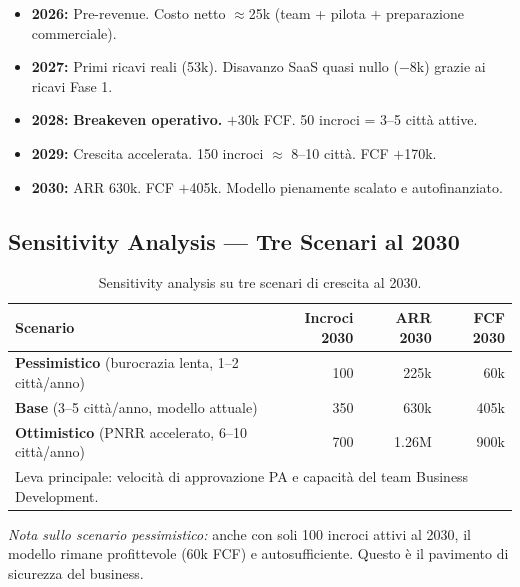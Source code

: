 \documentclass[a4paper,11pt]{article}
\begin{document}
\begin{tcolorbox}[
    enhanced, colback=green!5!white, colframe=SmartGreen,
    title=\textbf{Milestone Finanziarie Chiave}, boxrule=0.5mm
]
\begin{itemize}[nosep, topsep=4pt]
    \item \textbf{2026:} Pre-revenue. Costo netto $\approx$\texteuro{}25k (team + pilota + preparazione commerciale).
    \item \textbf{2027:} Primi ricavi reali (\texteuro{}53k). Disavanzo SaaS quasi nullo ($-$\texteuro{}8k) grazie ai ricavi Fase 1.
    \item \textbf{2028:} \textbf{Breakeven operativo.} $+$\texteuro{}30k FCF. 50 incroci = 3--5 città attive.
    \item \textbf{2029:} Crescita accelerata. 150 incroci $\approx$ 8--10 città. FCF $+$\texteuro{}170k.
    \item \textbf{2030:} ARR \texteuro{}630k. FCF $+$\texteuro{}405k. Modello pienamente scalato e autofinanziato.
\end{itemize}
\end{tcolorbox}

\subsection{Sensitivity Analysis --- Tre Scenari al 2030}

\begin{table}[h!]
\centering
\renewcommand{\arraystretch}{1.3}
\begin{tabular}{l r r r}
\toprule
\textbf{Scenario} & \textbf{Incroci 2030} & \textbf{ARR 2030} & \textbf{FCF 2030} \\
\midrule
\textbf{Pessimistico} (burocrazia lenta, 1--2 città/anno) & 100  & \texteuro{}225k & \texteuro{}60k  \\
\textbf{Base} (3--5 città/anno, modello attuale)           & 350  & \texteuro{}630k & \texteuro{}405k \\
\textbf{Ottimistico} (PNRR accelerato, 6--10 città/anno)  & 700  & \texteuro{}1.26M & \texteuro{}900k \\
\midrule
\multicolumn{4}{l}{\small Leva principale: velocità di approvazione PA e capacità del team Business Development.} \\
\bottomrule
\end{tabular}
\caption{Sensitivity analysis su tre scenari di crescita al 2030.}
\end{table}

\noindent\textit{Nota sullo scenario pessimistico:} anche con soli 100 incroci attivi al 2030, il modello rimane profittevole (\texteuro{}60k FCF) e autosufficiente. Questo è il pavimento di sicurezza del business.
\end{document}
